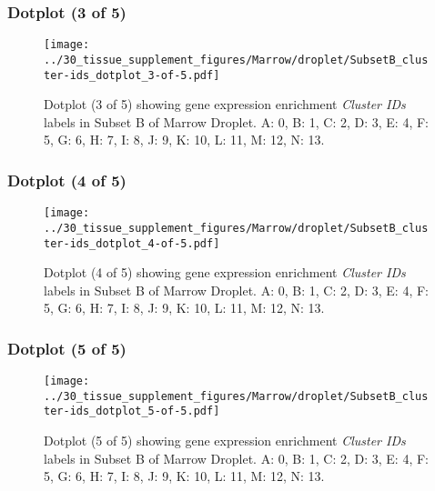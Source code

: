 \clearpage

\subsubsection{Dotplot (3 of 5)}
\begin{figure}[h]
\centering
\texttt{[image: ../30\_tissue\_supplement\_figures/Marrow/droplet/SubsetB\_cluster-ids\_dotplot\_3-of-5.pdf]}

\caption{ Dotplot (3 of 5)  showing gene expression enrichment \emph{Cluster IDs} labels in Subset B of Marrow Droplet. A: 0, B: 1, C: 2, D: 3, E: 4, F: 5, G: 6, H: 7, I: 8, J: 9, K: 10, L: 11, M: 12, N: 13.}
\end{figure}


\clearpage

\subsubsection{Dotplot (4 of 5)}
\begin{figure}[h]
\centering
\texttt{[image: ../30\_tissue\_supplement\_figures/Marrow/droplet/SubsetB\_cluster-ids\_dotplot\_4-of-5.pdf]}

\caption{ Dotplot (4 of 5)  showing gene expression enrichment \emph{Cluster IDs} labels in Subset B of Marrow Droplet. A: 0, B: 1, C: 2, D: 3, E: 4, F: 5, G: 6, H: 7, I: 8, J: 9, K: 10, L: 11, M: 12, N: 13.}
\end{figure}


\clearpage

\subsubsection{Dotplot (5 of 5)}
\begin{figure}[h]
\centering
\texttt{[image: ../30\_tissue\_supplement\_figures/Marrow/droplet/SubsetB\_cluster-ids\_dotplot\_5-of-5.pdf]}

\caption{ Dotplot (5 of 5)  showing gene expression enrichment \emph{Cluster IDs} labels in Subset B of Marrow Droplet. A: 0, B: 1, C: 2, D: 3, E: 4, F: 5, G: 6, H: 7, I: 8, J: 9, K: 10, L: 11, M: 12, N: 13.}
\end{figure}


